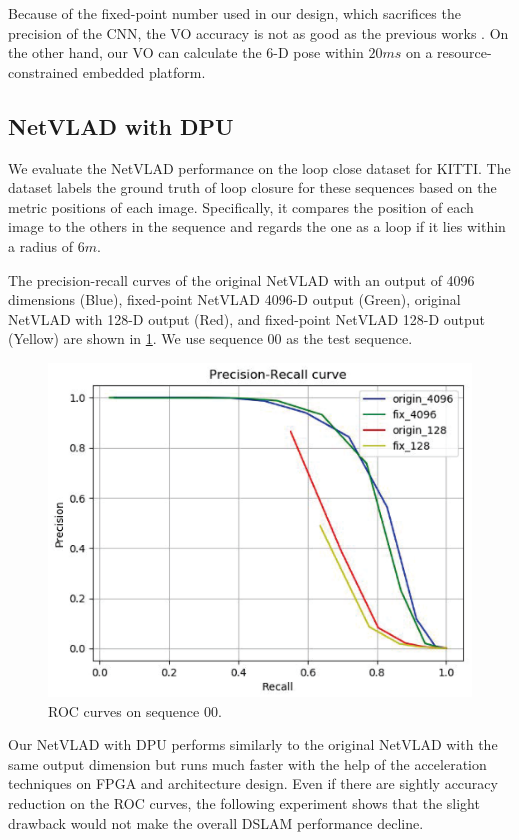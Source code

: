 Because of the fixed-point number used in our design, which sacrifices the precision of the CNN, the VO accuracy is not as good as the previous works \cite{Mur-Artal:2017281, Zhan:2018e92}. On the other hand, our VO can calculate the 6-D pose within $20ms$ on a resource-constrained embedded platform.

\subsection{NetVLAD with DPU}

We evaluate the NetVLAD performance on the loop close dataset for KITTI\cite{KITTIGroundTruth}.
The dataset labels the ground truth of loop closure for these sequences based on the metric positions of each image. Specifically, it compares the position of each image to the others in the sequence and regards the one as a loop if it lies within a radius of $6m$.

The precision-recall curves of the original NetVLAD with an output of 4096 dimensions (Blue), fixed-point NetVLAD 4096-D output (Green), original NetVLAD with 128-D output (Red), and fixed-point NetVLAD 128-D output (Yellow) are shown in \cref{fig:reloc}. We use sequence 00 as the test sequence.


\begin{figure}[t]
  \centering  
  \includegraphics[width=0.85\linewidth]{fig/val_reloc.eps}
  \caption{ROC curves on sequence 00.}
  \label{fig:reloc}
\end{figure}

Our NetVLAD with DPU performs similarly to the original NetVLAD with the same output dimension but runs much faster with the help of the acceleration techniques on FPGA and architecture design. Even if there are sightly accuracy reduction on the ROC curves, the following experiment shows that the slight drawback would not make the overall DSLAM performance decline.


